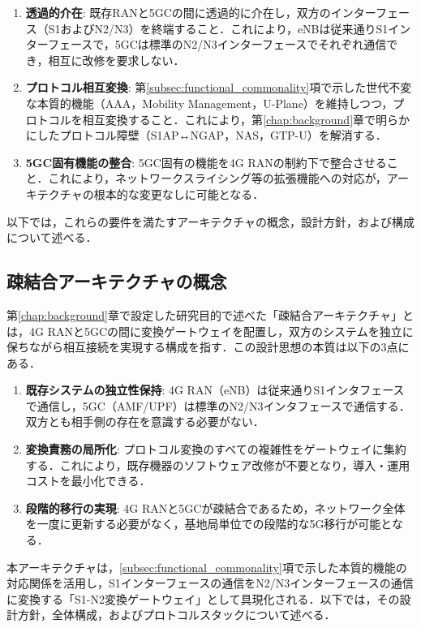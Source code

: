 \begin{enumerate}
    \item[\textbf{R1}] \textbf{透過的介在}: 既存RANと5GCの間に透過的に介在し，双方のインターフェース（S1およびN2/N3）を終端すること．これにより，eNBは従来通りS1インターフェースで，5GCは標準のN2/N3インターフェースでそれぞれ通信でき，相互に改修を要求しない．
    \item[\textbf{R2}] \textbf{プロトコル相互変換}: 第\ref{subsec:functional_commonality}項で示した世代不変な本質的機能（AAA，Mobility Management，U-Plane）を維持しつつ，プロトコルを相互変換すること．これにより，第\ref{chap:background}章で明らかにしたプロトコル障壁（S1AP↔NGAP，NAS，GTP-U）を解消する．
    \item[\textbf{R3}] \textbf{5GC固有機能の整合}: 5GC固有の機能を4G RANの制約下で整合させること．これにより，ネットワークスライシング等の拡張機能への対応が，アーキテクチャの根本的な変更なしに可能となる．
\end{enumerate}

以下では，これらの要件を満たすアーキテクチャの概念，設計方針，および構成について述べる．

\subsection{疎結合アーキテクチャの概念}
\label{subsec:loosely_coupled_concept}

第\ref{chap:background}章で設定した研究目的で述べた「疎結合アーキテクチャ」とは，4G RANと5GCの間に変換ゲートウェイを配置し，双方のシステムを独立に保ちながら相互接続を実現する構成を指す．この設計思想の本質は以下の3点にある．

\begin{enumerate}
\item \textbf{既存システムの独立性保持}: 4G RAN（eNB）は従来通りS1インタフェースで通信し，5GC（AMF/UPF）は標準のN2/N3インタフェースで通信する．双方とも相手側の存在を意識する必要がない．
\item \textbf{変換責務の局所化}: プロトコル変換のすべての複雑性をゲートウェイに集約する．これにより，既存機器のソフトウェア改修が不要となり，導入・運用コストを最小化できる．
\item \textbf{段階的移行の実現}: 4G RANと5GCが疎結合であるため，ネットワーク全体を一度に更新する必要がなく，基地局単位での段階的な5G移行が可能となる．
\end{enumerate}

本アーキテクチャは，\ref{subsec:functional_commonality}項で示した本質的機能の対応関係を活用し，S1インターフェースの通信をN2/N3インターフェースの通信に変換する「S1-N2変換ゲートウェイ」として具現化される．以下では，その設計方針，全体構成，およびプロトコルスタックについて述べる．

